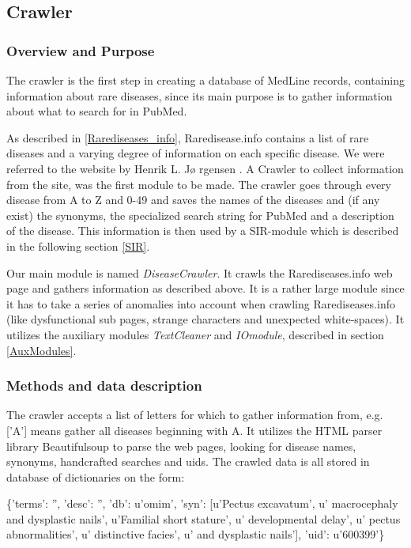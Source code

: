 \subsection{Crawler\label{Crawler}}

\subsubsection{Overview and Purpose}
The crawler is the first step in creating a database of MedLine
records, containing information about rare diseases, since its main
purpose is to gather information about what to search for in PubMed.

As described in \ref{Rarediseases_info}, Raredisease.info contains a
list of rare diseases and a varying degree of information on each
specific disease. We were referred to the website by Henrik L.  J\o
rgensen \cite{TheDude}. A Crawler to collect information from the
site, was the first module to be made. The crawler goes through every
disease from A to Z and 0-49 and saves the names of the diseases and
(if any exist) the synonyms, the specialized search string for PubMed
and a description of the disease. This information is then used by a
SIR-module which is described in the following section \ref{SIR}.

Our main module is named \textit{DiseaseCrawler}. It crawls the
Rarediseases.info web page and gathers information as described
above. It is a rather large module since it has to take a series of
anomalies into account when crawling Rarediseases.info (like
dysfunctional sub pages, strange characters and unexpected
white-spaces). It utilizes the auxiliary modules \textit{TextCleaner}
and \textit{IOmodule}, described in section \ref{AuxModules}.


\subsubsection{Methods and data description}
The crawler accepts a list of letters for which to gather information
from, e.g. ['A'] means gather all diseases beginning with A. It
utilizes the HTML parser library Beautifulsoup \cite{BS} to parse the
web pages, looking for disease names, synonyms, handcrafted searches
and uids. The crawled data is all stored in database of dictionaries
on the form:

\begin{center}
{\small
\{'terms': '', 'desc': '', 'db': u'omim', 'syn': [u'Pectus excavatum', u' macrocephaly and dysplastic nails', u'Familial short stature', u' developmental delay', u' pectus abnormalities', u' distinctive facies', u' and dysplastic nails'], 'uid': u'600399'\} 
}
\end{center}

